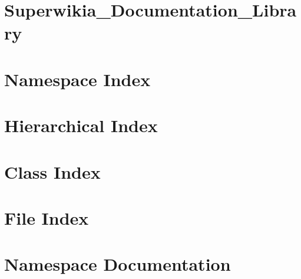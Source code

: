 \documentclass[twoside]{book}
\newcommand{\+}{\discretionary{\mbox{\scriptsize$\hookleftarrow$}}{}{}}
\begin{document}
\chapter{Superwikia\+\_\+\+Documentation\+\_\+\+Library}
\label{da/db1/md__c_1__users__stacy__staples__documents__git_hub__superwikia-_alpha-_codebase__superwikia-_doc9210198d3b229ea5c31a8566a6a99e35}
\hypertarget{da/db1/md__c_1__users__stacy__staples__documents__git_hub__superwikia-_alpha-_codebase__superwikia-_doc9210198d3b229ea5c31a8566a6a99e35}{}

\chapter{Namespace Index}

\chapter{Hierarchical Index}

\chapter{Class Index}

\chapter{File Index}

\chapter{Namespace Documentation}

















\end{document}
